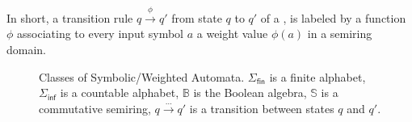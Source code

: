 
In short, a transition rule $q \xrightarrow{\phi} q'$ from state $q$ to $q'$ of a \SWA,
is labeled by a function $\phi$ associating to every input symbol $a$ a weight value $\phi(a)$
in a semiring domain.
%
\begin{figure}
\centering
{}
\caption{Classes of Symbolic/Weighted Automata.
$\Sigma_\mathsf{fin}$ is a finite alphabet,
$\Sigma_\mathsf{inf}$ is a countable alphabet,
$\mathbb{B}$ is the Boolean algebra,
$\mathbb{S}$ is a commutative semiring,
$q \xrightarrow{\dots} q'$ is a transition between states $q$ and $q'$.}
\label{fig:hierarchy}
\end{figure}
